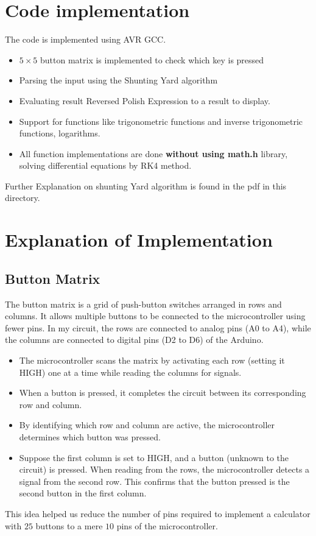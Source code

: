 \documentclass[a4paper,12pt]{article}
\begin{document}
\section*{Code implementation}
The code is implemented using AVR GCC.
\begin{itemize}
    \item $5\times 5$ button matrix is implemented to check which key is pressed
    \item Parsing the input using the Shunting Yard algorithm
    \item Evaluating result Reversed Polish Expression to a result to display.
    \item Support for functions like trigonometric functions and inverse trigonometric functions, logarithms.
    \item All function implementations are done \textbf{without using math.h} library, solving differential equations by RK4 method.
\end{itemize}

Further Explanation on shunting Yard algorithm is found in the pdf in this directory.

\section*{Explanation of Implementation}
\subsection*{Button Matrix}
The button matrix is a grid of push-button switches arranged in rows and columns. It allows multiple buttons to be connected to the microcontroller using fewer pins. In my circuit, the rows are connected to analog pins (A0 to A4), while the columns are connected to digital pins (D2 to D6) of the Arduino.
\begin{itemize}
    \item The microcontroller scans the matrix by activating each row (setting it HIGH) one at a time while reading the columns for signals.
    \item When a button is pressed, it completes the circuit between its corresponding row and column.
    \item By identifying which row and column are active, the microcontroller determines which button was pressed.
    \item Suppose the first column is set to $ \text{HIGH} $, and a button (unknown to the circuit) is pressed. When reading from the rows, the microcontroller detects a signal from the second row. This confirms that the button pressed is the second button in the first column.
\end{itemize}
This idea helped us reduce the number of pins required to implement a calculator with $25$ buttons to a mere $10$ pins of the microcontroller.
\end{document}
